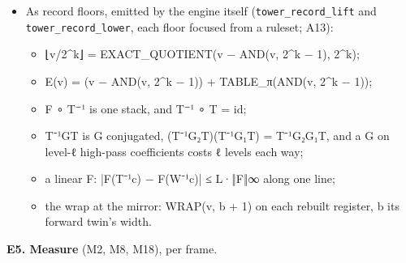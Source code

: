\begin{itemize}
\begin{itemize}
\end{itemize}
\item As record floors, emitted by the engine itself (\texttt{tower\_\allowbreak{}record\_\allowbreak{}lift} and \texttt{tower\_\allowbreak{}record\_\allowbreak{}lower}, each floor focused from a ruleset; A13):

\begin{itemize}
\item ⌊v/2\textasciicircum{}k⌋ = EXACT\_\allowbreak{}QUOTIENT(v − AND(v, 2\textasciicircum{}k − 1), 2\textasciicircum{}k);
\item E(v) = (v − AND(v, 2\textasciicircum{}k − 1)) + TABLE\_\allowbreak{}π(AND(v, 2\textasciicircum{}k − 1));
\item F ∘ T⁻¹ is one stack, and T⁻¹ ∘ T = id;
\item T⁻¹GT is G conjugated, (T⁻¹G₂T)(T⁻¹G₁T) = T⁻¹G₂G₁T, and a G on level-ℓ high-pass coefficients costs ℓ levels each way;
\item a linear F: |F(T⁻¹c) − F(W⁻¹c)| ≤ L·‖F‖∞ along one line;
\item the wrap at the mirror: WRAP(v, b + 1) on each rebuilt register, b its forward twin's width.
\end{itemize}
\end{itemize}

\textbf{E5. Measure} (M2, M8, M18), per frame.

